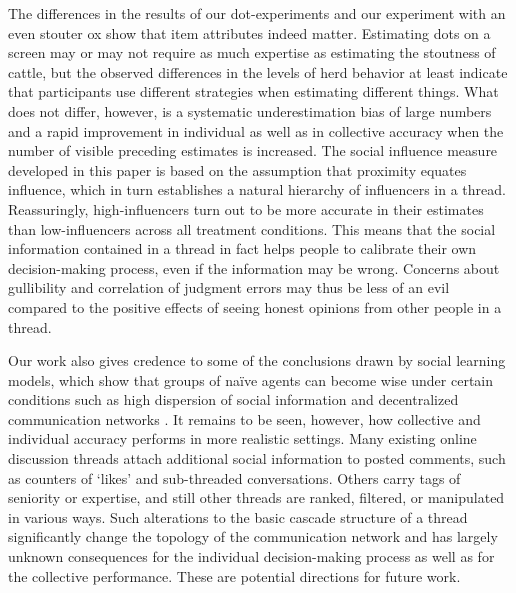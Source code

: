 \documentclass[9pt,twocolumn,twoside,lineno]{article}
\begin{document}
The differences in the results of our dot-experiments and our experiment with an even stouter ox show that item attributes indeed matter. Estimating dots on a screen may or may not require as much expertise as estimating the stoutness of cattle, but the observed differences in the levels of herd behavior at least indicate that participants use different strategies when estimating different things. What does not differ, however, is a systematic underestimation bias of large numbers and a rapid improvement in individual as well as in collective accuracy when the number of visible preceding estimates is increased. The social influence measure developed in this paper is based on the assumption that proximity equates influence, which in turn establishes a natural hierarchy of influencers in a thread. Reassuringly, high-influencers turn out to be more accurate in their estimates than low-influencers across all treatment conditions. This means that the social information contained in a thread in fact helps people to calibrate their own decision-making process, even if the information may be wrong. Concerns about gullibility and correlation of judgment errors may thus be less of an evil compared to the positive effects of seeing honest opinions from other people in a thread.

Our work also gives credence to some of the conclusions drawn by social learning models, which show that groups of naïve agents can become wise under certain conditions such as high dispersion of social information \cite{golub2010naive} and decentralized communication networks \cite{becker2017network}. It remains to be seen, however, how collective and individual accuracy performs in more realistic settings. Many existing online discussion threads attach additional social information to posted comments, such as counters of ‘likes’ and sub-threaded conversations. Others carry tags of seniority or expertise, and still other threads are ranked, filtered, or manipulated in various ways. Such alterations to the basic cascade structure of a thread significantly change the topology of the communication network and has largely unknown consequences for the individual decision-making process as well as for the collective performance. These are potential directions for future work.
\end{document}
